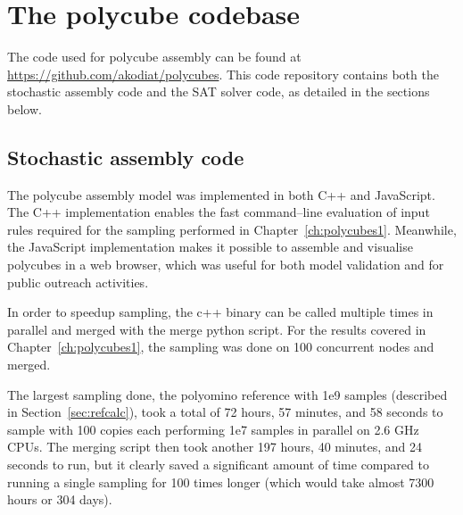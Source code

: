 

\chapter{The polycube codebase}
\label{ch:appendix_polycubes}

\minitoc

The code used for polycube assembly can be found at \url{https://github.com/akodiat/polycubes}. This code repository contains both the stochastic assembly code and the SAT solver code, as detailed in the sections below.

\section{Stochastic assembly code}
The polycube assembly model was implemented in both C++ and JavaScript. The C++ implementation enables the fast command--line evaluation of input rules required for the sampling performed in Chapter~\ref{ch:polycubes1}. Meanwhile, the JavaScript implementation makes it possible to assemble and visualise polycubes in a web browser, which was useful for both model validation and for public outreach activities.

In order to speedup sampling, the c++ binary can be called multiple times in parallel and merged with the merge python script. For the results covered in Chapter~\ref{ch:polycubes1}, the sampling was done on 100 concurrent nodes and merged.

The largest sampling done, the polyomino reference with 1e9 samples (described in Section~\ref{sec:refcalc}), took a total of 72 hours, 57 minutes, and 58 seconds to sample with 100 copies each performing 1e7 samples in parallel on 2.6 GHz CPUs. The merging script then took another 197 hours, 40 minutes, and 24 seconds to run, but it clearly saved a significant amount of time compared to running a single sampling for 100 times longer (which would take almost 7300 hours or 304 days). 

